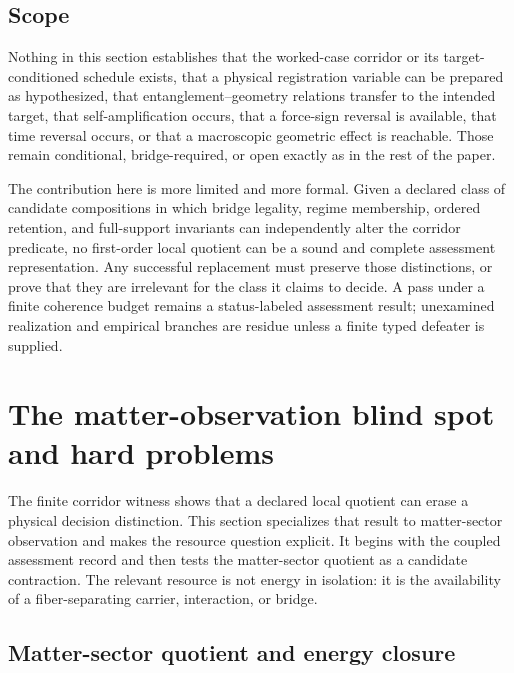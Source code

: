 \documentclass[11pt]{article}
\theoremstyle{definition}
\begin{document}
\subsection{Scope}
\label{supp:strict-separation-scope}

Nothing in this section establishes that the worked-case corridor or its
target-conditioned schedule exists, that a physical registration variable can be
prepared as hypothesized, that entanglement--geometry relations transfer to the
intended target, that self-amplification occurs, that a force-sign reversal is
available, that time reversal occurs, or that a macroscopic geometric effect is
reachable.
Those remain conditional, bridge-required, or open exactly as in the rest of the
paper.

The contribution here is more limited and more formal. Given a declared class of
candidate compositions in which bridge legality, regime membership, ordered
retention, and full-support invariants can independently alter the corridor
predicate, no first-order local quotient can be a sound and complete assessment
representation. Any successful replacement must preserve those distinctions, or
prove that they are irrelevant for the class it claims to decide. A pass under a
finite coherence budget remains a status-labeled assessment result; unexamined
realization and empirical branches are residue unless a finite typed defeater is
supplied.



\section{The matter-observation blind spot and hard problems}
\label{supp:matter-blindspot}

The finite corridor witness shows that a declared local quotient can erase a
physical decision distinction. This section specializes that result to
matter-sector observation and makes the resource question explicit. It begins with
the coupled assessment record and then tests the matter-sector quotient as a
candidate contraction. The relevant resource is not energy in isolation: it is the
availability of a fiber-separating carrier, interaction, or bridge.

\subsection{Matter-sector quotient and energy closure}
\end{document}

